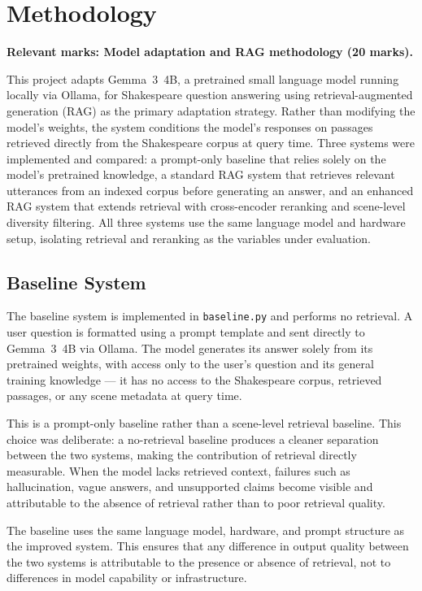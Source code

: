 \documentclass[10pt,conference]{IEEEtran}
\begin{document}
\section{Methodology}
\label{sec:methodology}

\textbf{Relevant marks: Model adaptation and RAG methodology
(20 marks).}

This project adapts Gemma~3~4B, a pretrained small language model
running locally via Ollama, for Shakespeare question answering using
retrieval-augmented generation (RAG) as the primary adaptation
strategy. Rather than modifying the model's weights, the system
conditions the model's responses on passages retrieved directly from
the Shakespeare corpus at query time. Three systems were implemented
and compared: a prompt-only baseline that relies solely on the
model's pretrained knowledge, a standard RAG system that retrieves
relevant utterances from an indexed corpus before generating an
answer, and an enhanced RAG system that extends retrieval with
cross-encoder reranking and scene-level diversity filtering. All
three systems use the same language model and hardware setup,
isolating retrieval and reranking as the variables under evaluation.

\subsection{Baseline System}

The baseline system is implemented in \texttt{baseline.py} and
performs no retrieval. A user question is formatted using a prompt
template and sent directly to Gemma~3~4B via Ollama. The model
generates its answer solely from its pretrained weights, with access
only to the user's question and its general training knowledge ---
it has no access to the Shakespeare corpus, retrieved passages, or
any scene metadata at query time.

This is a prompt-only baseline rather than a scene-level retrieval
baseline. This choice was deliberate: a no-retrieval baseline
produces a cleaner separation between the two systems, making the
contribution of retrieval directly measurable. When the model lacks
retrieved context, failures such as hallucination, vague answers,
and unsupported claims become visible and attributable to the
absence of retrieval rather than to poor retrieval quality.

The baseline uses the same language model, hardware, and prompt
structure as the improved system. This ensures that any difference
in output quality between the two systems is attributable to the
presence or absence of retrieval, not to differences in model
capability or infrastructure.
\end{document}
